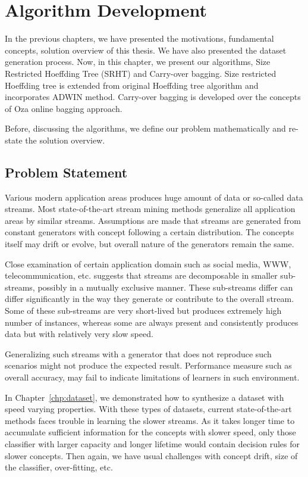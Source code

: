 \chapter{Algorithm Development}
\label{chp:algo}
In the previous chapters, we have presented the motivations, fundamental concepts, solution overview of this thesis. We have also presented the dataset generation process. Now, in this chapter, we present our algorithms, Size Restricted Hoeffding Tree (SRHT) and Carry-over bagging. Size restricted Hoeffding tree is extended from original Hoeffding tree algorithm and incorporates ADWIN method. Carry-over bagging is developed over the concepts of Oza online bagging approach.

Before, discussing the algorithms, we define our problem mathematically and re-state the solution overview. 

\section{Problem Statement}
Various modern application areas produces huge amount of data or so-called data streams. Most state-of-the-art stream mining methods generalize all application areas by similar streams. Assumptions are made that streams are generated from constant generators with concept following a certain distribution. The concepts itself may drift or evolve, but overall nature of the generators remain the same.

Close examination of certain application domain such as social media, WWW, telecommunication, etc. suggests that streams are decomposable in smaller sub-streams, possibly in a mutually exclusive manner. These sub-streams differ can differ significantly in the way they generate or contribute to the overall stream. Some of these sub-streams are very short-lived but produces extremely high number of instances, whereas some are always present and consistently produces data but with relatively very slow speed.

Generalizing such streams with a generator that does not reproduce such scenarios might not produce the expected result. Performance measure such as overall accuracy, may fail to indicate limitations of learners in such environment.

In Chapter~\ref{chp:dataset}, we demonstrated how to synthesize a dataset with speed varying properties. With these types of datasets, current state-of-the-art methods faces trouble in learning the slower streams. As it takes longer time to accumulate sufficient information for the concepts with slower speed, only those classifier with larger capacity and longer lifetime would contain decision rules for slower concepts. Then again, we have usual challenges with concept drift, size of the classifier, over-fitting, etc.

